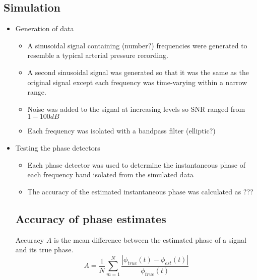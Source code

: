 \documentclass{article}
\begin{document}
\subsection*{Simulation}
\begin{itemize}
\item Generation of data
	\begin{itemize}
	\item A sinusoidal signal containing (number?) frequencies were generated to resemble a typical arterial pressure recording. 
	\item A second sinusoidal signal was generated so that it was the same as the original signal except each frequency was time-varying within a narrow range.
	\item Noise was added to the signal at increasing levels so SNR ranged from $1-100 dB$
	\item Each frequency was isolated with a bandpass filter (elliptic?)
	\end{itemize}
\item Testing the phase detectors
	\begin{itemize}
	\item Each phase detector was used to determine the instantaneous phase of each frequency band isolated from the simulated data
	\item The accuracy of the estimated instantaneous phase was calculated as ???
	\end{itemize}
	
\subsection*{Accuracy of phase estimates}
Accuracy $A$ is the mean difference between the estimated phase of a signal and its true phase. 
$$ A = \frac{1}{N} \sum_{m=1}^{N} \frac{\left| \phi _{true} (t) - \phi _{est} (t) \right|}{\phi _{true} (t)} $$


\end{itemize}
\end{document}
